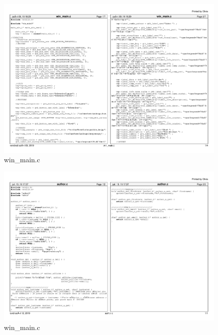 \documentclass[11pt,french,a4paper]{report}
\begin{document}
\begin{landscape}
\begin{figure}[h]
    \centering
    \includegraphics[page=1,scale=0.85]{../code/win_main_c.pdf}
    \caption{win\_main.c}
    \label{an5}
\end{figure}
\end{landscape}

\begin{landscape}
\begin{figure}[h]
    \centering
    \includegraphics[page=1,scale=0.85]{../code/author.pdf}
    \caption{win\_main.c}
    \label{an6}
\end{figure}
\end{landscape}
\end{document}
